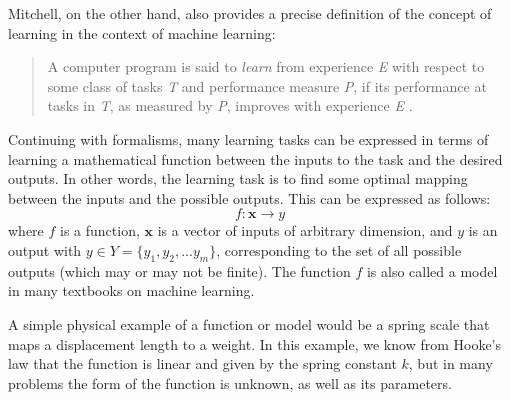 

Mitchell, on the other hand,  also provides a precise definition of the concept of learning in the context of machine learning:
%
\begin{quote}
A computer program is said to \emph{learn} from experience \emph{E} with respect to some class of tasks \emph{T} and performance measure \emph{P}, if its performance at tasks in \emph{T}, as measured by \emph{P}, improves with experience \emph{E} \cite{Mitchell1997}.
\end{quote}
%
%
%


Continuing with formalisms, many learning tasks can be expressed in terms of learning a mathematical function between the inputs to the task and the desired outputs. In other words, the learning task is to find some optimal mapping between the inputs and the possible outputs. This can be expressed as follows:
%
\begin{equation}
f : \mathbf{x} \rightarrow y
\end{equation}where $f$ is a function, $\mathbf{x}$ is a vector of inputs of arbitrary dimension, and $y$ is an output with $y \in Y=\{y_1, y_2,...y_m\}$, corresponding to the set of all possible outputs (which may or may not be finite). The function $f$ is also called a model in many textbooks on machine learning.

A simple physical example of a function or model would be a spring scale that maps a displacement length to a weight. In this example, we know from Hooke's law that the function is linear and given by the spring constant $k$, but in many problems the form of the function is unknown, as well as its parameters.

